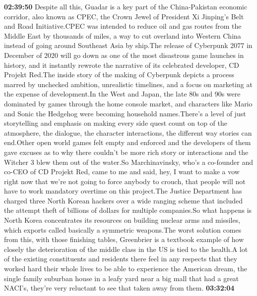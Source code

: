 \documentclass{article}%
\begin{document}
\textbf{02:39:50}%
\newline%
Despite all this, Guadar is a key part of the China{-}Pakistan economic corridor, also known as CPEC, the Crown Jewel of President Xi Jinping's Belt and Road Initiative.CPEC was intended to reduce oil and gas routes from the Middle East by thousands of miles, a way to cut overland into Western China instead of going around Southeast Asia by ship.The release of Cyberpunk 2077 in December of 2020 will go down as one of the most disastrous game launches in history, and it instantly rewrote the narrative of its celebrated developer, CD Projekt Red.The inside story of the making of Cyberpunk depicts a process marred by unchecked ambition, unrealistic timelines, and a focus on marketing at the expense of development.In the West and Japan, the late 80s and 90s were dominated by games through the home console market, and characters like Mario and Sonic the Hedgehog were becoming household names.There's a level of just storytelling and emphasis on making every side quest count on top of the atmosphere, the dialogue, the character interactions, the different way stories can end.Other open world games felt empty and enforced and the developers of them gave excuses as to why there couldn't be more rich story or interactions and the Witcher 3 blew them out of the water.So Marchinavinsky, who's a co{-}founder and co{-}CEO of CD Projekt Red, came to me and said, hey, I want to make a vow right now that we're not going to force anybody to crouch, that people will not have to work mandatory overtime on this project.The Justice Department has charged three North Korean hackers over a wide ranging scheme that included the attempt theft of billions of dollars for multiple companies.So what happens is North Korea concentrates its resources on building nuclear arms and missiles, which exports called basically a symmetric weapons.The worst solution comes from this, with those  finishing tables, Greenbrier is a textbook example of how closely the deterioration of the middle class in the US is tied to the health.A lot of the existing constituents and residents there feel in any respects that they worked hard their whole lives to be able to experience the American dream, the single family suburban house in a leafy yard near a big mall that had a great NACI's, they're very reluctant to see that taken away from them.%
\textbf{03:32:04}%
\newline%
\end{document}
